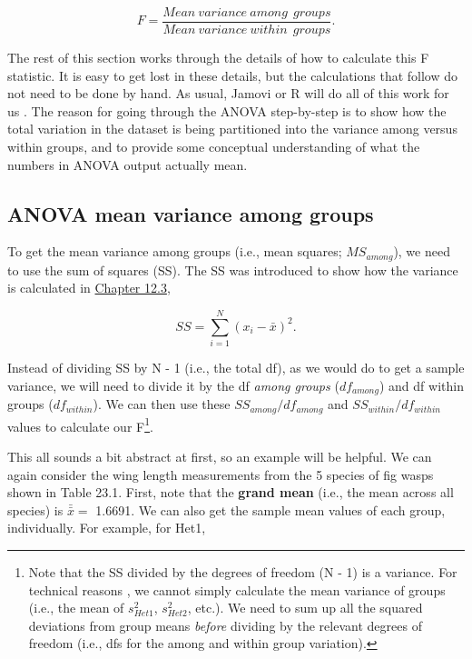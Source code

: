 \documentclass[
]{scrbook}
\begin{document}
\[F = \frac{Mean\:variance\:among\:\:groups}{Mean\:variance\:within\:\:groups}.\]

The rest of this section works through the details of how to calculate this F statistic.
It is easy to get lost in these details, but the calculations that follow do not need to be done by hand.
As usual, Jamovi or R will do all of this work for us \citep{Jamovi2022, Rproject}.
The reason for going through the ANOVA step-by-step is to show how the total variation in the dataset is being partitioned into the variance among versus within groups, and to provide some conceptual understanding of what the numbers in ANOVA output actually mean.

\hypertarget{anova-mean-variance-among-groups}{%
\subsection{ANOVA mean variance among groups}\label{anova-mean-variance-among-groups}}

To get the mean variance among groups (i.e., mean squares; \(MS_{among}\)), we need to use the sum of squares (SS).
The SS was introduced to show how the variance is calculated in \protect\hyperlink{the-variance}{Chapter 12.3},

\[SS = \sum_{i = 1}^{N}\left(x_{i} - \bar{x} \right)^{2}.\]

Instead of dividing SS by N - 1 (i.e., the total df), as we would do to get a sample variance, we will need to divide it by the df \emph{among groups} (\(df_{among}\)) and df within groups (\(df_{within}\)).
We can then use these \(SS_{among}/df_{among}\) and \(SS_{within}/df_{within}\) values to calculate our F\footnote{Note that the SS divided by the degrees of freedom (N - 1) is a variance. For technical reasons \citep{Sokal1995}, we cannot simply calculate the mean variance of groups (i.e., the mean of \(s^{2}_{Het1}\), \(s^{2}_{Het2}\), etc.). We need to sum up all the squared deviations from group means \emph{before} dividing by the relevant degrees of freedom (i.e., dfs for the among and within group variation).}.

This all sounds a bit abstract at first, so an example will be helpful.
We can again consider the wing length measurements from the 5 species of fig wasps shown in Table 23.1.
First, note that the \textbf{grand mean} (i.e., the mean across all species) is \(\bar{\bar{x}} =\) 1.6691.
We can also get the sample mean values of each group, individually.
For example, for Het1,
\end{document}

